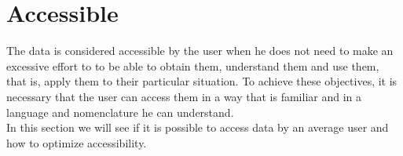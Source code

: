 \newpage
\section{Accessible}

The data is considered accessible by the user when he does not need to make an excessive effort to
to be able to obtain them, understand them and use them, that is, apply them to their particular situation. To achieve these objectives,
it is necessary that the user can access them in a way that is familiar and in a language and nomenclature
he can understand.\\ 

In this section we will see if it is possible to access data by an average user and how to optimize accessibility.











    
